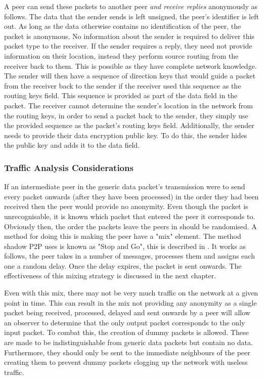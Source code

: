 \documentclass[ %
                    author={Luke Murray},
                supervisor={Dr. Simon Hollis},
                     title={Shadow Peer-to-Peer Networks},
                  subtitle={},
                    degree={MEng},
                      year={2013} ]{thesis}
\begin{document}
A peer can send these packets to another peer {\em and receive replies} anonymously as follows. The data that the sender sends is left unsigned, the peer's identifier is left out. As long as the data otherwise contains no identification of the peer, the packet is anonymous. No information about the sender is required to deliver this packet type to the receiver. If the sender requires a reply, they need not provide information on their location, instead they perform source routing from the receiver back to them. This is possible as they have complete network knowledge. The sender will then have a sequence of direction keys that would guide a packet from the receiver back to the sender if the receiver used this sequence as the routing keys field. This sequence is provided as part of the data field in the packet. The receiver cannot determine the sender's location in the network from the routing keys, in order to send a packet back to the sender, they simply use the provided sequence as the packet's routing keys field. Additionally, the sender needs to provide their data encryption public key. To do this, the sender hides the public key and adds it to the data field.

\subsubsection{Traffic Analysis Considerations}

If an intermediate peer in the generic data packet's transmission were to send every packet onwards (after they have been processed) in the order they had been received then the peer would provide no anonymity. Even though the packet is unrecognisable, it is known which packet that entered the peer it corresponds to. Obviously then, the order the packets leave the peers in should be randomised. A method for doing this is making the peer have a "mix" element. The method shadow P2P uses is known as "Stop and Go", this is described in \cite{kesdogan1998stop}. It works as follows, the peer takes in a number of messages, processes them and assigns each one a random delay. Once the delay expires, the packet is sent onwards. The effectiveness of this mixing strategy is discussed in the next chapter.

Even with this mix, there may not be very much traffic on the network at a given point in time. This can result in the mix not providing any anonymity as a single packet being received, processed, delayed and sent onwards by a peer will allow an observer to determine that the only output packet corresponds to the only input packet. To combat this, the creation of dummy packets is allowed. These are made to be indistinguishable from generic data packets but contain no data. Furthermore, they should only be sent to the immediate neighbours of the peer creating them to prevent dummy packets clogging up the network with useless traffic.
\end{document}

